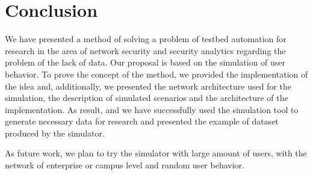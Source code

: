 
\section{Conclusion}

We have presented a method of solving a problem of testbed automation for research in the area of network security and security analytics regarding the problem of the lack of data. Our proposal is based on the simulation of user behavior. To prove the concept of the method, we provided the implementation of the idea and, additionally, we presented the network architecture used for the simulation, the description of simulated scenarios and the architecture of the implementation. As result, and we have successfully used the simulation tool to generate necessary data for research and presented the example of dataset produced by the simulator.

As future work, we plan to try the simulator with large amount of users, with the network of enterprise or campus level and random user behavior.